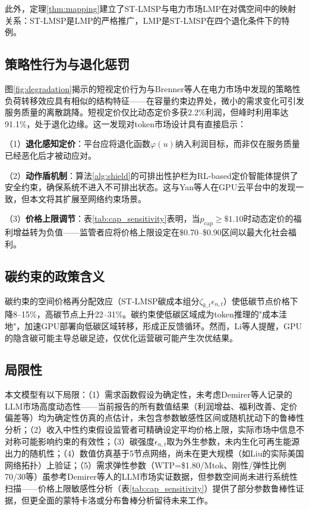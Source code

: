 \documentclass[11pt,a4paper,twocolumn]{article}
\begin{document}
此外，定理\ref{thm:mapping}建立了ST-LMSP与电力市场LMP在对偶空间中的映射关系：ST-LMSP是LMP的严格推广，LMP是ST-LMSP在四个退化条件下的特例。

\subsection{策略性行为与退化惩罚}

图\ref{fig:degradation}揭示的短视定价行为与Brenner等人\cite{brenner2026spatial}在电力市场中发现的策略性负荷转移效应具有相似的结构特征——在容量约束边界处，微小的需求变化可引发服务质量的离散跳降。短视定价仅比动态定价多获2.2\%利润，但峰时利用率达91.1\%，处于退化边缘。这一发现对token市场设计具有直接启示：

（1）\textbf{退化感知定价}：平台应将退化函数$\varphi(u)$纳入利润目标，而非仅在服务质量已经恶化后才被动应对。

（2）\textbf{动作盾机制}：算法\ref{alg:shield}的可排出性护栏为RL-based定价智能体提供了安全约束，确保系统不进入不可排出状态。这与Yan等人\cite{yan2026stackelberg}在GPU云平台中的发现一致，但本文将其扩展至网络约束场景。

（3）\textbf{价格上限调节}：表\ref{tab:cap_sensitivity}表明，当$p_{\text{cap}} \geq \$1.10$时动态定价的福利增益转为负值——监管者应将价格上限设定在\$0.70--\$0.90区间以最大化社会福利。

\subsection{碳约束的政策含义}

碳约束的空间价格再分配效应（ST-LMSP碳成本组分$\zeta_{k,t}\epsilon_{n,t}$）使低碳节点价格下降8--15\%，高碳节点上升22--31\%。碳约束使低碳区域成为token推理的"成本洼地"，加速GPU部署向低碳区域转移，形成正反馈循环。然而，Li等人\cite{li2025ecoserve}提醒，GPU的隐含碳可能主导总碳足迹，仅优化运营碳可能产生次优结果。

\subsection{局限性}

本文模型有以下局限：（1）需求函数假设为确定性，未考虑Demirer等人\cite{demirer2025emerging}记录的LLM市场高度动态性——当前报告的所有数值结果（利润增益、福利改善、定价偏差等）均为确定性仿真的点估计，未包含参数敏感性区间或随机扰动下的鲁棒性分析；（2）收入中性约束假设监管者可精确设定平均价格上限，实际市场中信息不对称可能影响约束的有效性；（3）碳强度$\epsilon_{n,t}$取为外生参数，未内生化可再生能源出力的随机性；（4）数值仿真基于5节点网络，尚未在更大规模（如Liu\cite{liu2026locational}的实际美国网络拓扑）上验证；（5）需求弹性参数（WTP=\$1.80/Mtok、刚性/弹性比例70/30等）虽参考Demirer等人\cite{demirer2025emerging}的LLM市场实证数据，但参数空间尚未进行系统性扫描——价格上限敏感性分析（表\ref{tab:cap_sensitivity}）提供了部分参数鲁棒性证据，但更全面的蒙特卡洛或分布鲁棒分析留待未来工作。
\end{document}

